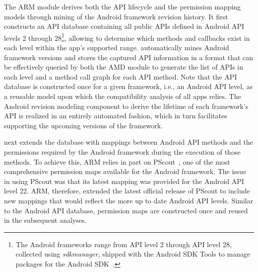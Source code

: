 The ARM module derives both the API lifecycle and the permission mapping models through mining of the Android framework revision history.
It first constructs an API database containing all public APIs defined in Android API levels 2 through 28\footnote{The Android frameworks range from API level 2 through API level 28, collected using {\it sdkmanager}, shipped with the Android SDK Tools to manage packages for the Android SDK~\cite{sdkmanager}. }, allowing \@approach to determine which methods and callbacks exist in each level within the app's supported range. \@approach automatically mines Android framework versions and stores the captured API information in a format that can be effectively queried by both the AMD module to generate the list of APIs in each level and a method call graph for each API method.
Note that the API database is constructed once for a given framework, i.e., an Android API level, as a reusable model upon which the compatibility analysis of all apps relies.
The Android revision modeling component to derive the lifetime of each framework's API is realized in an entirely automated fashion, which in turn facilitates supporting the upcoming versions of the framework. %



 \@approach next extends the database with mappings between Android API methods and the permissions required by the Android framework during the execution of those methods. To achieve this, ARM relies in part on PScout~\cite{au2012pscout}, one of the most comprehensive permission maps available for the Android framework. The issue in using PScout was that its latest mapping was provided for the Android API level 22. ARM, therefore, extended the latest official release of PScout to include new mappings that would reflect the more up to date Android API levels. Similar to the Android API database, permission maps are constructed once and reused in the subsequent analyses.
 

  

\begin{figure}[t!]%
        
        \vspace{-0.7cm}
\end{figure}


